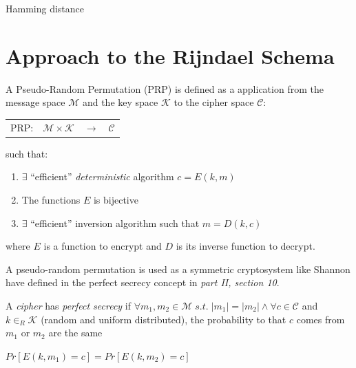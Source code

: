 \documentclass[10pt,a4paper,twoside]{llncs}
\begin{document}
\begin{definition}\label{def:hammingDistance}
 Hamming distance
\end{definition}

\section{Approach to the Rijndael Schema}\label{sec:approach}
\begin{definition}\label{def:PRP}
 A Pseudo-Random Permutation (PRP) is defined as a application from the message space $\mathcal{M}$ and the key space $\mathcal{K}$ to the cipher space $\mathcal{C}$:
 \begin{center}
  \begin{tabular}{llll}
   PRP: & $\mathcal{M} \times \mathcal{K}$ & $\rightarrow$ & $\mathcal{C}$ \\
  \end{tabular}
 \end{center}
 such that:
 \begin{enumerate}
  \item $\exists$ ``efficient'' \emph{deterministic} algorithm $c=E(k,m)$
  \item The functions $E$ is bijective
  \item $\exists$ ``efficient'' inversion algorithm such that $m=D(k,c)$
 \end{enumerate}
\end{definition}

where $E$ is a function to encrypt and $D$ is its inverse function to decrypt.

A pseudo-random permutation is used as a symmetric cryptosystem like Shannon have defined in \cite{shannon-comTheorySecSys} the perfect secrecy concept in \emph{part II, section 10}.
\begin{definition}\label{def:shannonPerfectSecrecy}
 A \emph{cipher} has \emph{perfect secrecy} if $\forall m_1, m_2 \in \mathcal{M} \;s.t.\; \left| m_1 \right| = \left| m_2 \right| \wedge \forall c \in \mathcal{C}$ and  $k\in_R\mathcal{K}$ (random and uniform distributed), the probability to that $c$ comes from $m_1$ or $m_2$ are the same
 \begin{center}
  $Pr[E(k,m_1)=c] = Pr[E(k,m_2)=c]$
 \end{center}
\end{definition}
\end{document}
